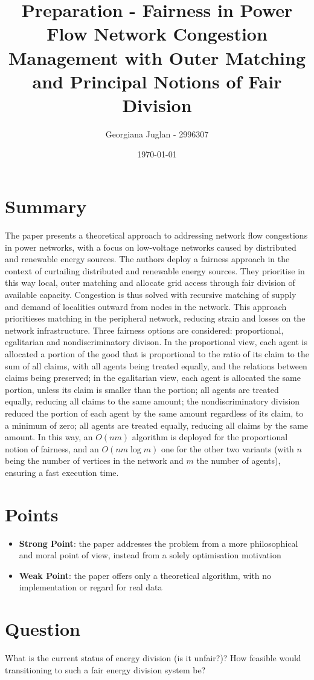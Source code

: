 \documentclass[11pt]{article}
\title{Preparation - Fairness in Power Flow Network Congestion Management with Outer Matching and Principal Notions of Fair Division}
\author{Georgiana Juglan - 2996307}
\date{\today}
\begin{document}
\maketitle

\section{Summary}
The paper presents a theoretical approach to addressing network flow congestions in power networks, with a focus on low-voltage networks caused by distributed and renewable energy sources. The authors deploy a fairness approach in the context of curtailing distributed and renewable energy sources. They prioritise in this way local, outer matching and allocate grid access through fair division of available capacity. Congestion is thus solved with recursive matching of supply and demand of localities outward from nodes in the network. This approach prioritieses matching in the peripheral network, reducing strain and losses on the network infrastructure. Three fairness options are considered: proportional, egalitarian and nondiscriminatory divison. In the proportional view, each agent is allocated a portion of the good that is proportional to the ratio of its claim to the sum of all claims, with all agents being treated equally, and the relations between claims being preserved; in the egalitarian view, each agent is allocated the same portion, unless its claim is smaller than the portion; all agents are treated equally, reducing all claims to the same amount; the nondiscriminatory division reduced the portion of each agent by the same amount regardless of its claim, to a minimum of zero; all agents are treated equally, reducing all claims by the same amount. In this way, an $O(nm)$ algorithm is deployed for the proportional notion of fairness, and an $O(nm\log m)$ one for the other two variants (with $n$ being the number of vertices in the network and $m$ the number of agents), ensuring a fast execution time.

\section{Points}
    \begin{itemize}
        \item \textbf{Strong Point}: the paper addresses the problem from a more philosophical and moral point of view, instead from a solely optimisation motivation
        \item \textbf{Weak Point}: the paper offers only a theoretical algorithm, with no implementation or regard for real data
    \end{itemize}

\section{Question}
What is the current status of energy division (is it unfair?)? How feasible would transitioning to such a fair energy division system be? 
\end{document}
